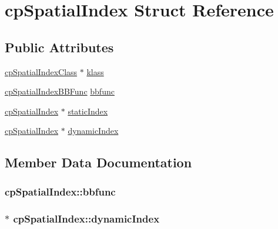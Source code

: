\hypertarget{structcp_spatial_index}{}\section{cp\+Spatial\+Index Struct Reference}
\label{structcp_spatial_index}
\subsection*{Public Attributes}
\begin{DoxyCompactItemize}
\item 
\hyperlink{structcp_spatial_index_class}{cp\+Spatial\+Index\+Class} $\ast$ \hyperlink{structcp_spatial_index_a50ab17be758c40f3418556c34a0d874b}{klass}
\item 
\hyperlink{group__cp_spatial_index_gaa8cf991cadcee1fbb6ee9379a0a6e0ea}{cp\+Spatial\+Index\+B\+B\+Func} \hyperlink{structcp_spatial_index_ad6e7a1b402cf155bb95d0521163723fb}{bbfunc}
\item 
\hyperlink{structcp_spatial_index}{cp\+Spatial\+Index} $\ast$ \hyperlink{structcp_spatial_index_a5f335a8f9cb241596a08c6ea16ae726b}{static\+Index}
\item 
\hyperlink{structcp_spatial_index}{cp\+Spatial\+Index} $\ast$ \hyperlink{structcp_spatial_index_a4d673c66c292b52cf22ac0bbf26fe65f}{dynamic\+Index}
\end{DoxyCompactItemize}


\subsection{Member Data Documentation}
\hypertarget{structcp_spatial_index_ad6e7a1b402cf155bb95d0521163723fb}{}
\subsubsection[{bbfunc}]{ cp\+Spatial\+Index\+::bbfunc}\label{structcp_spatial_index_ad6e7a1b402cf155bb95d0521163723fb}
\hypertarget{structcp_spatial_index_a4d673c66c292b52cf22ac0bbf26fe65f}{}
\subsubsection[{dynamic\+Index}]{ $\ast$ cp\+Spatial\+Index\+::dynamic\+Index}\label{structcp_spatial_index_a4d673c66c292b52cf22ac0bbf26fe65f}
\hypertarget{structcp_spatial_index_a50ab17be758c40f3418556c34a0d874b}{}
